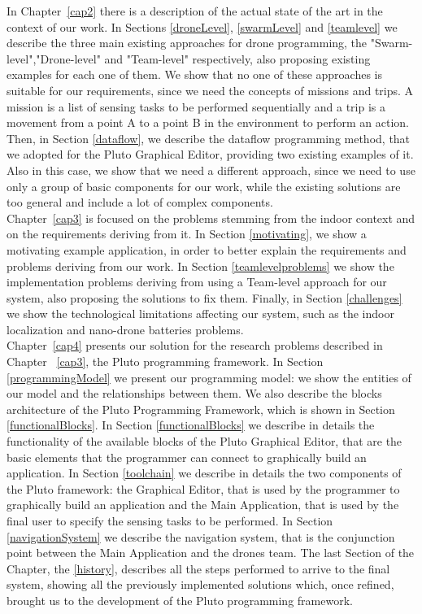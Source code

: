 In Chapter~\ref{cap2} there is a description of the actual state of the art in the context of our work.
In Sections \ref{droneLevel}, \ref{swarmLevel} and \ref{teamlevel} we describe the three main existing approaches for drone programming, the "Swarm-level","Drone-level" and "Team-level" respectively, also proposing existing examples for each one of them.
We show that no one of these approaches is suitable for our requirements, since we need the concepts of missions and trips.
A mission is a list of sensing tasks to be performed sequentially and a trip is a movement from a point A to a point B in the environment to perform an action.
Then, in Section \ref{dataflow}, we describe the dataflow programming method, that we adopted for the Pluto Graphical Editor, providing two existing examples of it.
Also in this case, we show that we need a different approach, since we need to use only a group of basic components for our work, while the existing solutions are too general and include a lot of complex components.
\\

Chapter~\ref{cap3} is focused on the problems stemming from the indoor context and on the requirements deriving from it.
In Section \ref{motivating}, we show a motivating example application, in order to better explain the requirements and problems deriving from our work.
In Section \ref{teamlevelproblems} we show the implementation problems deriving from using a Team-level approach for our system, also proposing the solutions to fix them.
Finally, in Section \ref{challenges} we show the technological limitations affecting our system, such as the indoor localization and nano-drone batteries problems.
\\

Chapter~\ref{cap4} presents our solution for the research problems described in Chapter ~\ref{cap3}, the Pluto programming framework.
In Section \ref{programmingModel} we present our programming model:
we show the entities of our model and the relationships between them.
We also describe the blocks architecture of the Pluto Programming Framework, which is shown in Section \ref{functionalBlocks}.
In Section \ref{functionalBlocks} we describe in details the functionality of the available blocks of the Pluto Graphical Editor, that are the basic elements that the programmer can connect to graphically build an application.
In Section \ref{toolchain} we describe in details the two components of the Pluto framework:
the Graphical Editor, that is used by the programmer to graphically build an application and the Main Application, that is used by the final user to specify the sensing tasks to be performed.
In Section \ref{navigationSystem} we describe the navigation system, that is the conjunction point between the Main Application and the drones team.
The last Section of the Chapter, the \ref{history}, describes all the steps performed to arrive to the final system, showing all the previously implemented solutions which, once refined, brought us to the development of the Pluto programming framework.
\\

